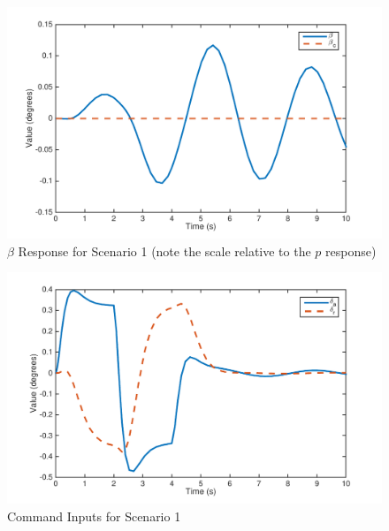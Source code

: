 \documentclass[11pt]{article}
\begin{document}
\begin{figure}[h!]
\begin{center}
\includegraphics[height=.33\textheight]{figures/beta2}
\caption{$\beta$ Response for Scenario 1 (note the scale relative to the $p$ response)}
\end{center}
\end{figure}

\begin{figure}[h!]
\begin{center}
\includegraphics[height=.4\textheight]{figures/inputs2}
\caption{Command Inputs for Scenario 1}
\end{center}
\end{figure}
\end{document}
